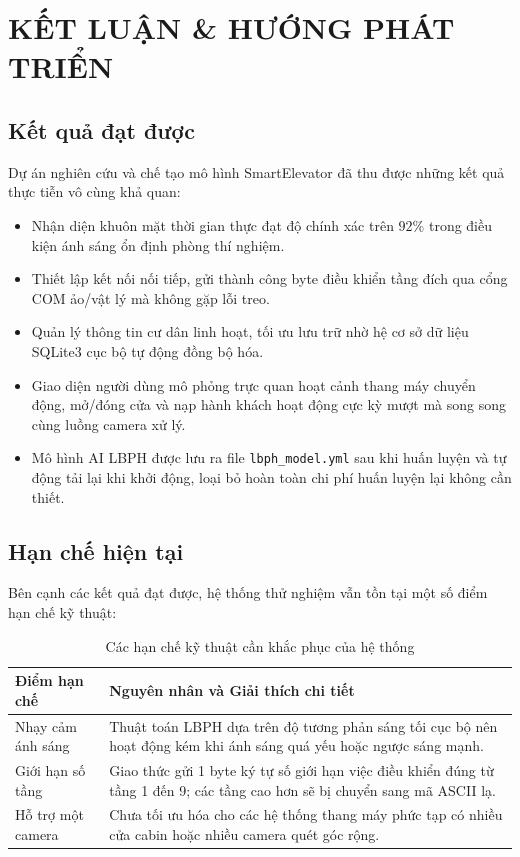 \documentclass[12pt,a4paper]{article}
\begin{document}
\newpage

\section{KẾT LUẬN \& HƯỚNG PHÁT TRIỂN}

\subsection{Kết quả đạt được}
Dự án nghiên cứu và chế tạo mô hình SmartElevator đã thu được những kết quả thực tiễn vô cùng khả quan:
\begin{itemize}
    \item[$\checkmark$] Nhận diện khuôn mặt thời gian thực đạt độ chính xác trên $92\%$ trong điều kiện ánh sáng ổn định phòng thí nghiệm.
    \item[$\checkmark$] Thiết lập kết nối nối tiếp, gửi thành công byte điều khiển tầng đích qua cổng COM ảo/vật lý mà không gặp lỗi treo.
    \item[$\checkmark$] Quản lý thông tin cư dân linh hoạt, tối ưu lưu trữ nhờ hệ cơ sở dữ liệu SQLite3 cục bộ tự động đồng bộ hóa.
    \item[$\checkmark$] Giao diện người dùng mô phỏng trực quan hoạt cảnh thang máy chuyển động, mở/đóng cửa và nạp hành khách hoạt động cực kỳ mượt mà song song cùng luồng camera xử lý.
    \item[$\checkmark$] Mô hình AI LBPH được lưu ra file \texttt{lbph\_model.yml} sau khi huấn luyện và tự động tải lại khi khởi động, loại bỏ hoàn toàn chi phí huấn luyện lại không cần thiết.
\end{itemize}

\subsection{Hạn chế hiện tại}
Bên cạnh các kết quả đạt được, hệ thống thử nghiệm vẫn tồn tại một số điểm hạn chế kỹ thuật:
\begin{table}[H]
    \centering
    \begin{tabular}{|l|p{11.5cm}|}
        \hline
        \textbf{Điểm hạn chế} & \textbf{Nguyên nhân và Giải thích chi tiết} \\ \hline
        Nhạy cảm ánh sáng & Thuật toán LBPH dựa trên độ tương phản sáng tối cục bộ nên hoạt động kém khi ánh sáng quá yếu hoặc ngược sáng mạnh. \\ \hline
        Giới hạn số tầng & Giao thức gửi 1 byte ký tự số giới hạn việc điều khiển đúng từ tầng 1 đến 9; các tầng cao hơn sẽ bị chuyển sang mã ASCII lạ. \\ \hline
        Hỗ trợ một camera & Chưa tối ưu hóa cho các hệ thống thang máy phức tạp có nhiều cửa cabin hoặc nhiều camera quét góc rộng. \\ \hline
    \end{tabular}
    \caption{Các hạn chế kỹ thuật cần khắc phục của hệ thống}
    \label{tab:limitations}
\end{table}
\end{document}
